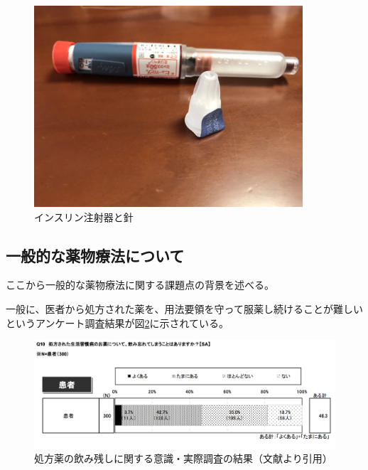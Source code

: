 \begin{figure}[htbp]
  \caption{インスリン注射器と針}
  \label{fig:insulin_pen_needle}
  \begin{center}
    \includegraphics[bb=0 0 1300 1200,width=10cm]{assets/insulin_pen_needle.jpg}
  \end{center}
\end{figure}

\newpage

\subsection{一般的な薬物療法について}
\label{subsection:drug_treatment}

ここから一般的な薬物療法に関する課題点の背景を述べる。

一般に、医者から処方された薬を、用法要領を守って服薬し続けることが難しいというアンケート調査結果が図\ref{fig:forget_medicine_number}に示されている。

\begin{figure}[htbp]
  \caption{処方薬の飲み残しに関する意識・実際調査の結果（文献\cite{drug_treatment_investigation}より引用）}
  \label{fig:forget_medicine_number}
  \begin{center}
    \includegraphics[bb=0 0 1000 400,width=15cm]{assets/forget_medicine_number.png}
  \end{center}
\end{figure}

